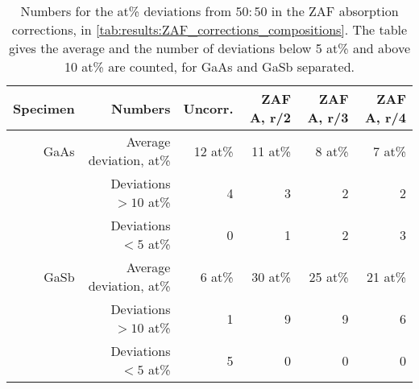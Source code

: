 \begin{table}[phtb]
    \begin{center}
        \caption{
            Numbers for the at\% deviations from $50:50$ in the ZAF absorption corrections, in \cref{tab:results:ZAF_corrections_compositions}.
            The table gives the average and the number of deviations below 5 at\% and above 10 at\% are counted, for GaAs and GaSb separated.
        }
        \label{tab:results:ZAF_corrections_compositions_stats}
        \begin{tabular}{rrrrrr}
            \hline
            \textbf{Specimen} & \textbf{Numbers}        & \textbf{Uncorr.} & \textbf{ZAF A, r/2} & \textbf{ZAF A, r/3} & \textbf{ZAF A, r/4} \\
            \hline

            GaAs              & Average deviation, at\% & 12 at\%          & 11 at\%             & 8 at\%              & 7 at\%              \\
                              & Deviations $>10$ at\%   & 4                & 3                   & 2                   & 2                   \\
                              & Deviations  $<5$  at\%  & 0                & 1                   & 2                   & 3                   \\
            \hline
            GaSb              & Average deviation, at\% & 6 at\%           & 30 at\%             & 25 at\%             & 21 at\%             \\
                              & Deviations $>10$ at\%   & 1                & 9                   & 9                   & 6                   \\
                              & Deviations  $<5$  at\%  & 5                & 0                   & 0                   & 0                   \\

            \hline
        \end{tabular}
    \end{center}
\end{table}
